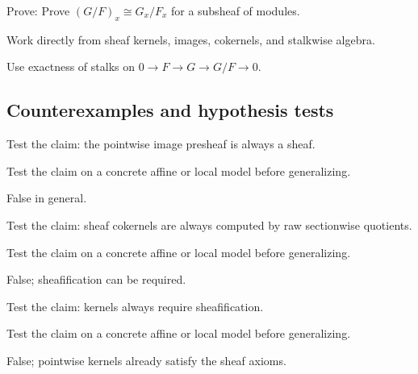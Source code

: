 \begin{exercise}\label{exr:vi15-expand-09}
Prove: Prove $(G/F)_x\cong G_x/F_x$ for a subsheaf of modules.
\end{exercise}
\begin{hint}
Work directly from sheaf kernels, images, cokernels, and stalkwise algebra.
\end{hint}
\begin{solution}
Use exactness of stalks on $0\to F\to G\to G/F\to0$.
\end{solution}

\subsection*{Counterexamples and hypothesis tests}

\begin{exercise}\label{exr:vi15-expand-10}
Test the claim: the pointwise image presheaf is always a sheaf.
\end{exercise}
\begin{hint}
Test the claim on a concrete affine or local model before generalizing.
\end{hint}
\begin{solution}
False in general.
\end{solution}

\begin{exercise}\label{exr:vi15-expand-11}
Test the claim: sheaf cokernels are always computed by raw sectionwise quotients.
\end{exercise}
\begin{hint}
Test the claim on a concrete affine or local model before generalizing.
\end{hint}
\begin{solution}
False; sheafification can be required.
\end{solution}

\begin{exercise}\label{exr:vi15-expand-12}
Test the claim: kernels always require sheafification.
\end{exercise}
\begin{hint}
Test the claim on a concrete affine or local model before generalizing.
\end{hint}
\begin{solution}
False; pointwise kernels already satisfy the sheaf axioms.
\end{solution}

